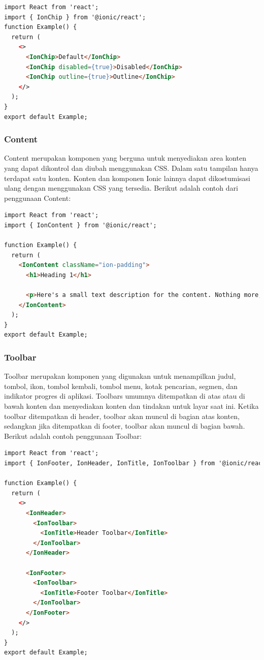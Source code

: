 \begin{lstlisting}[language=HTML, caption=Contoh kode untuk membuat Button, label=kode:ion-chip]
import React from 'react';
import { IonChip } from '@ionic/react';
function Example() {
  return (
    <>
      <IonChip>Default</IonChip>
      <IonChip disabled={true}>Disabled</IonChip>
      <IonChip outline={true}>Outline</IonChip>
    </>
  );
}
export default Example;
\end{lstlisting}

\subsubsection{Content}
Content merupakan komponen yang berguna untuk menyediakan area konten yang dapat dikontrol dan diubah menggunakan CSS. Dalam satu tampilan hanya terdapat satu konten. Konten dan komponen Ionic lainnya dapat dikostumisasi ulang dengan menggunakan CSS yang tersedia. Berikut adalah contoh dari penggunaan Content:

\begin{lstlisting}[language=HTML, caption=Contoh kode untuk membuat Content, label=kode:ion-content]
import React from 'react';
import { IonContent } from '@ionic/react';

function Example() {
  return (
    <IonContent className="ion-padding">
      <h1>Heading 1</h1>

      <p>Here's a small text description for the content. Nothing more, nothing less.</p>
    </IonContent>
  );
}
export default Example;
\end{lstlisting}

\subsubsection{Toolbar}
Toolbar merupakan komponen yang digunakan untuk menampilkan judul, tombol, ikon, tombol kembali, tombol menu, kotak pencarian, segmen, dan indikator progres di aplikasi. Toolbars umumnya ditempatkan di atas atau di bawah konten dan menyediakan konten dan tindakan untuk layar saat ini. Ketika toolbar ditempatkan di header, toolbar akan muncul di bagian atas konten, sedangkan jika ditempatkan di footer, toolbar akan muncul di bagian bawah. Berikut adalah contoh penggunaan Toolbar:

\begin{lstlisting}[language=HTML, caption=Contoh kode untuk membuat Toolbar, label=kode:ion-toolbar]
import React from 'react';
import { IonFooter, IonHeader, IonTitle, IonToolbar } from '@ionic/react';

function Example() {
  return (
    <>
      <IonHeader>
        <IonToolbar>
          <IonTitle>Header Toolbar</IonTitle>
        </IonToolbar>
      </IonHeader>

      <IonFooter>
        <IonToolbar>
          <IonTitle>Footer Toolbar</IonTitle>
        </IonToolbar>
      </IonFooter>
    </>
  );
}
export default Example;
\end{lstlisting}

